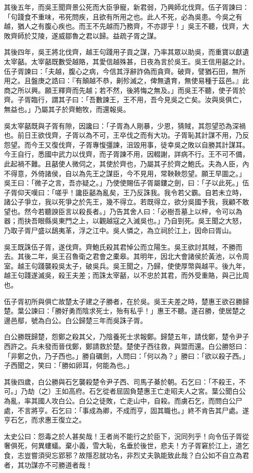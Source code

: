 \begin{pinyinscope}
其後五年，而吳王聞齊景公死而大臣爭寵，新君弱，乃興師北伐齊。伍子胥諫曰：「句踐食不重味，弔死問疾，且欲有所用之也。此人不死，必為吳患。今吳之有越，猶人之有腹心疾也。而王不先越而乃務齊，不亦謬乎！」吳王不聽，伐齊，大敗齊師於艾陵，遂威鄒魯之君以歸。益疏子胥之謀。

其後四年，吳王將北伐齊，越王句踐用子貢之謀，乃率其眾以助吳，而重寶以獻遺太宰嚭。太宰嚭既數受越賂，其愛信越殊甚，日夜為言於吳王。吳王信用嚭之計。伍子胥諫曰：「夫越，腹心之病，今信其浮辭詐偽而貪齊。破齊，譬猶石田，無所用之。且盤庚之誥曰：『有顛越不恭，劓殄滅之，俾無遺育，無使易種于茲邑。』此商之所以興。願王釋齊而先越；若不然，後將悔之無及。」而吳王不聽，使子胥於齊。子胥臨行，謂其子曰：「吾數諫王，王不用，吾今見吳之亡矣。汝與吳俱亡，無益也。」乃屬其子於齊鮑牧，而還報吳。

吳太宰嚭既與子胥有隙，因讒曰：「子胥為人剛暴，少恩，猜賊，其怨望恐為深禍也。前日王欲伐齊，子胥以為不可，王卒伐之而有大功。子胥恥其計謀不用，乃反怨望。而今王又復伐齊，子胥專愎彊諫，沮毀用事，徒幸吳之敗以自勝其計謀耳。今王自行，悉國中武力以伐齊，而子胥諫不用，因輟謝，詳病不行。王不可不備，此起禍不難。且嚭使人微伺之，其使於齊也，乃屬其子於齊之鮑氏。夫為人臣，內不得意，外倚諸侯，自以為先王之謀臣，今不見用，常鞅鞅怨望。願王早圖之。」吳王曰：「微子之言，吾亦疑之。」乃使使賜伍子胥屬鏤之劍，曰：「子以此死。」伍子胥仰天嘆曰：「嗟乎！讒臣嚭為亂矣，王乃反誅我。我令若父霸。自若未立時，諸公子爭立，我以死爭之於先王，幾不得立。若既得立，欲分吳國予我，我顧不敢望也。然今若聽諛臣言以殺長者。」乃告其舍人曰：「必樹吾墓上以梓，令可以為器；而抉吾眼縣吳東門之上，以觀越寇之入滅吳也。」乃自剄死。吳王聞之大怒，乃取子胥尸盛以鴟夷革，浮之江中。吳人憐之，為立祠於江上，因命曰胥山。

吳王既誅伍子胥，遂伐齊。齊鮑氏殺其君悼公而立陽生。吳王欲討其賊，不勝而去。其後二年，吳王召魯衛之君會之橐皋。其明年，因北大會諸侯於黃池，以令周室。越王句踐襲殺吳太子，破吳兵。吳王聞之，乃歸，使使厚幣與越平。後九年，越王句踐遂滅吳，殺王夫差；而誅太宰嚭，以不忠於其君，而外受重賂，與己比周也。

伍子胥初所與俱亡故楚太子建之子勝者，在於吳。吳王夫差之時，楚惠王欲召勝歸楚。葉公諫曰：「勝好勇而陰求死士，殆有私乎！」惠王不聽。遂召勝，使居楚之邊邑鄢，號為白公。白公歸楚三年而吳誅子胥。

白公勝既歸楚，怨鄭之殺其父，乃陰養死士求報鄭。歸楚五年，請伐鄭，楚令尹子西許之。兵未發而晉伐鄭，鄭請救於楚。楚使子西往救，與盟而還。白公勝怒曰：「非鄭之仇，乃子西也。」勝自礪劍，人問曰：「何以為？」勝曰：「欲以殺子西。」子西聞之，笑曰：「勝如卵耳，何能為也。」

其後四歲，白公勝與石乞襲殺楚令尹子西、司馬子綦於朝。石乞曰：「不殺王，不可。」乃劫（之）王如高府。石乞從者屈固負楚惠王亡走昭夫人之宮。葉公聞白公為亂，率其國人攻白公。白公之徒敗，亡走山中，自殺。而虜石乞，而問白公尸處，不言將亨。石乞曰：「事成為卿，不成而亨，固其職也。」終不肯告其尸處。遂亨石乞，而求惠王復立之。

太史公曰：怨毒之於人甚矣哉！王者尚不能行之於臣下，況同列乎！向令伍子胥從奢俱死，何異螻蟻。棄小義，雪大恥，名垂於後世，悲夫！方子胥窘於江上，道乞食，志豈嘗須臾忘郢邪？故隱忍就功名，非烈丈夫孰能致此哉？白公如不自立為君者，其功謀亦不可勝道者哉！


\end{pinyinscope}